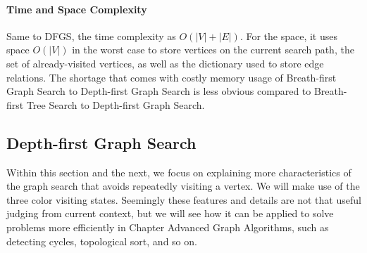 \documentclass[main.tex]{subfiles}
\begin{document}
\paragraph{Time and Space Complexity}  Same to DFGS, the time complexity as $O(|V|+|E|)$. For the space, it uses space $O(|V|)$ in the worst case to
store vertices on the current search path, the set of
already-visited vertices, as well as the dictionary used to store edge relations. The shortage that comes with costly memory usage of Breath-first Graph Search to Depth-first Graph Search is less obvious compared to Breath-first Tree Search to Depth-first Graph Search. 

\subsection{Depth-first Graph Search}
Within this section and the next, we focus on explaining more characteristics of the graph search that avoids repeatedly visiting a vertex. We will make use of the three color visiting states. Seemingly these features and details are not that useful judging from current context, but we will see how it can be applied to solve problems more efficiently in Chapter Advanced Graph Algorithms, such as detecting cycles, topological sort, and so on.
\end{document}
